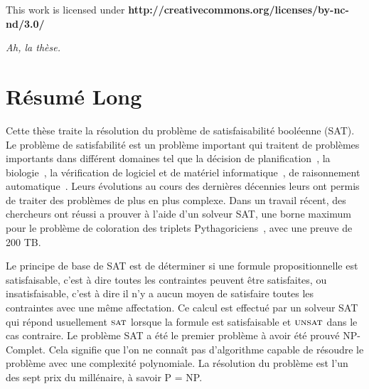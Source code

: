\clearpage\null\vfill
\thispagestyle{empty}
\begin{minipage}[b]{.9\textwidth}
  \begin{center}
  \setlength{\parskip}{.5\baselineskip}
  {\color{phdcol0}%
   \ccLogo\hspace{.1cm}%
   \ccAttribution\hspace{.1cm}%
   \ccNonCommercial\hspace{.1cm}%
   \ccNoDerivatives}\hspace{.15cm}%
  \footnotesize%
  This work is licensed under {\color{phdcol1}\textbf{http://creativecommons.org/licenses/by-nc-nd/3.0/}}
  \end{center}
\end{minipage}
\vspace*{2\baselineskip}

\clearpage

\thispagestyle{empty}
\begin{flushright}
  \textit{Ah, la thèse.}
\end{flushright}
%
%
%

%
\chapter*{Résumé Long}


Cette thèse traite la résolution du problème de satisfaisabilité booléenne (SAT).
Le problème de satisfabilité est un problème important qui traitent de problèmes importants dans différent domaines tel 
que la décision de planification~\cite{planning_92}, la biologie~\cite{biology_06}, la vérification de logiciel et de 
matériel informatique~\cite{biere1999symbolic}, de raisonnement automatique~\cite{heule2016solving}.
Leurs évolutions au cours des dernières décennies leurs ont permis de traiter des problèmes de plus en plus complexe.
Dans un travail récent, des chercheurs ont réussi a prouver à l'aide d'un solveur SAT, une borne maximum
pour le problème de coloration des triplets Pythagoriciens~\cite{heule2016solving}, avec une preuve de 200 TB.


Le principe de base de SAT est de déterminer si une formule propositionnelle
est satisfaisable, c'est à dire toutes les contraintes peuvent être satisfaites,
ou insatisfaisable, c'est à dire il n'y a aucun moyen de satisfaire toutes les contraintes avec une même affectation.
Ce calcul est effectué par un solveur SAT qui répond usuellement $\textsc{sat}$ lorsque la formule est satisfaisable et $\textsc{unsat}$ dans le cas
contraire.
Le problème SAT a été le premier problème à avoir été prouvé NP-Complet. Cela signifie que
l'on ne connaît pas d'algorithme capable de résoudre le problème avec une complexité polynomiale.
La résolution du problème est l'un des sept prix du millénaire, à savoir P = NP.


